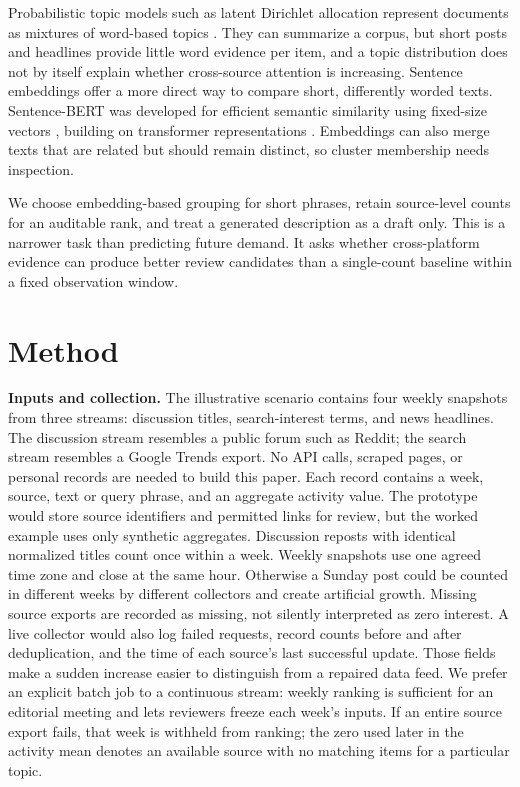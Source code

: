 \documentclass[../../proceedings/main.tex]{subfiles}
\begin{document}
\begin{refsection}
Probabilistic topic models such as latent Dirichlet allocation represent
documents as mixtures of word-based topics \autocite{blei2003lda}. They can
summarize a corpus, but short posts and headlines provide little word evidence
per item, and a topic distribution does not by itself explain whether
cross-source attention is increasing. Sentence embeddings offer a more direct
way to compare short, differently worded texts. Sentence-BERT was developed
for efficient semantic similarity using fixed-size vectors
\autocite{reimers2019sbert}, building on transformer representations
\autocite{vaswani2017attention}. Embeddings can also merge texts that are
related but should remain distinct, so cluster membership needs inspection.

We choose embedding-based grouping for short phrases, retain source-level
counts for an auditable rank, and treat a generated description as a draft
only. This is a narrower task than predicting future demand. It asks whether
cross-platform evidence can produce better review candidates than a
single-count baseline within a fixed observation window.

\section{Method}
\textbf{Inputs and collection.} The illustrative scenario contains four
weekly snapshots from three streams: discussion titles, search-interest
terms, and news headlines. The discussion stream resembles a public forum
such as Reddit; the search stream resembles a Google Trends export. No API
calls, scraped pages, or personal records are needed to build this paper.
Each record contains a week, source, text or query phrase, and an aggregate
activity value. The prototype would store source identifiers and permitted
links for review, but the worked example uses only synthetic aggregates.
Discussion reposts with identical normalized titles count once within a week.
Weekly snapshots use one agreed time zone and close at the same hour.
Otherwise a Sunday post could be counted in different weeks by different
collectors and create artificial growth. Missing source exports are recorded
as missing, not silently interpreted as zero interest. A live collector would
also log failed requests, record counts before and after deduplication, and
the time of each source's last successful update. Those fields make a sudden
increase easier to distinguish from a repaired data feed. We prefer an
explicit batch job to a continuous stream: weekly ranking is sufficient for
an editorial meeting and lets reviewers freeze each week's inputs.
If an entire source export fails, that week is withheld from ranking; the
zero used later in the activity mean denotes an available source with no
matching items for a particular topic.


\end{refsection}
\end{document}
